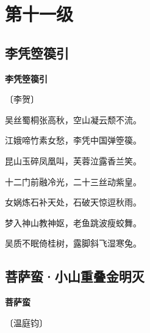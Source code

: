 \documentclass[12pt,UTF-8,openany,fontset=none]{ctexbook}
\begin{document}
\chapter{第十一级}
\clearpage

\section{李凭箜篌引}


\begin{center}
    {\bfseries 李凭箜篌引}

    \vspace{18pt}

    \begin{large}\xuwen
        〔李贺〕
    \end{large}

\end{center}

    \vspace{18pt}  %

\begin{center}
    \begin{Large}

        吴丝蜀桐张高秋，空山凝云颓不流。

        江娥啼竹素女愁，李凭中国弹箜篌。

        昆山玉碎凤凰叫，芙蓉泣露香兰笑。

        十二门前融冷光，二十三丝动紫皇。

        女娲炼石补天处，石破天惊逗秋雨。

        梦入神山教神妪，老鱼跳波瘦蛟舞。

        吴质不眠倚桂树，露脚斜飞湿寒兔。

    \end{Large}

\end{center}

\vspace{8pt}
\clearpage

\section{菩萨蛮·小山重叠金明灭}


\begin{center}
    {\bfseries 菩萨蛮}

    \vspace{18pt}

    \begin{large}\xuwen
        〔温庭钧〕
    \end{large}

\end{center}
\end{document}
